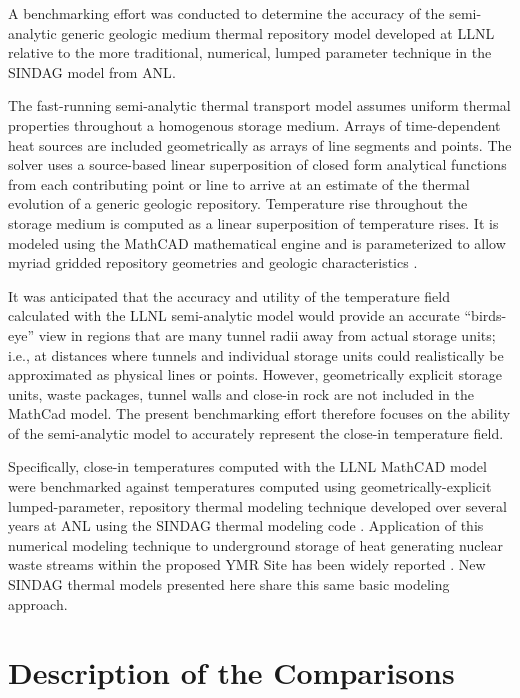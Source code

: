 
A benchmarking effort was conducted to determine the accuracy of the 
semi-analytic generic geologic medium thermal repository model developed at 
\gls{LLNL}\cite{hardin_generic_2011,greenberg_investigations_2012,greenberg_application_2012} 
relative to the more traditional, numerical, lumped parameter technique in the 
\gls{SINDAG} model from \gls{ANL}.

The fast-running semi-analytic thermal transport model assumes uniform thermal 
properties throughout a homogenous storage medium. Arrays of time-dependent heat 
sources are included geometrically as arrays of line segments and points.  The 
solver uses a source-based linear superposition of closed form analytical 
functions from each contributing point or line to arrive at an estimate of the 
thermal evolution of a generic geologic repository.  Temperature rise throughout 
the storage medium is computed as a linear superposition of temperature rises.  
It is modeled using the MathCAD mathematical engine and is parameterized to 
allow myriad gridded repository geometries and geologic characteristics 
\cite{ptc_mathcad_2010}.

It was anticipated that the accuracy and utility of the temperature field
calculated with the \gls{LLNL} semi-analytic model would provide an accurate 
``birds-eye''
view in regions that are many tunnel radii away from actual storage units;
i.e., at distances where tunnels and individual storage units could
realistically be approximated as physical lines or points. 
However, geometrically explicit storage units, waste packages, tunnel
walls and close-in rock are not included in the MathCad model. 
The present benchmarking effort therefore focuses on the ability of the 
semi-analytic model to accurately represent the close-in
temperature field.

Specifically, close-in temperatures computed with the \gls{LLNL} MathCAD model 
were benchmarked against temperatures computed using geometrically-explicit 
lumped-parameter, repository thermal modeling technique developed over several 
years at \gls{ANL} using the \gls{SINDAG} thermal modeling code 
\cite{gaski_sinda_1987}. Application of this numerical modeling technique to 
underground storage of heat generating nuclear waste streams within the proposed 
\gls{YMR} Site has been widely reported \cite{wigeland_separations_2006}.  New 
\gls{SINDAG} thermal models presented here share this same basic modeling 
approach. 

\section{Description of the Comparisons}

